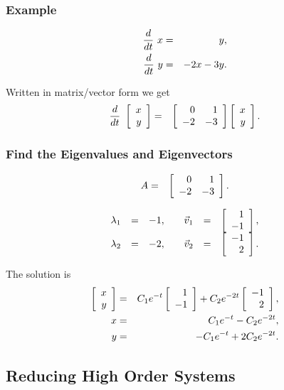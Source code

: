 \begin{frame}
  \frametitle{Example}
  
  \begin{eqnarray*}
    \deriv{~}{t} x & = &  y, \\
    \deriv{~}{t} y & = & -2 x -3y.
  \end{eqnarray*}

  {
    Written in matrix/vector form we get
    \begin{eqnarray*}
      \deriv{~}{t} \vecTwo{x}{y} & = & 
      \arrayTwo{0}{1}{-2}{-3} \vecTwo{x}{y}.
    \end{eqnarray*}
  }
  
\end{frame}

\begin{frame}
  \frametitle{Find the Eigenvalues and Eigenvectors}

  \begin{eqnarray*}
    A & = & \arrayTwo{0}{1}{-2}{-3}.
  \end{eqnarray*}

  {
    \begin{eqnarray*}
      \begin{array}{rcl@{\hspace{2em}}rcl}
          \lambda_1 & = & -1, & \vec{v}_1 & = & \vecTwo{1}{-1}, \\
          \lambda_2 & = & -2, & \vec{v}_2 & = & \vecTwo{-1}{2}.
        \end{array}
    \end{eqnarray*}
  }

  {
    The solution is
    \begin{eqnarray*}
       \vecTwo{x}{y} & = & C_1 e^{-t} \vecTwo{1}{-1}  + C_2 e^{-2t} \vecTwo{-1}{2}, \\
      x & = & C_1 e^{-t} - C_2 e^{-2t}, \\
      y & = & -C_1 e^{-t} + 2 C_2 e^{-2t}.
    \end{eqnarray*}
  }

\end{frame}


\subsection{Reducing High Order Systems}

